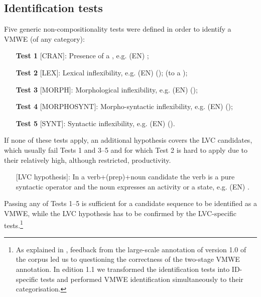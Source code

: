 \documentclass[output=paper,
modfonts,
]{langscibook}
\begin{document}
\subsection{Identification tests}
\label{sec:identify}
%
Five generic non-compositionality tests were defined in order to identify a VMWE (of any category):
\begin{itemize}
\item[]\label{test:cran}\textbf{Test 1} [CRAN]: Presence of a , e.g. (EN) ; 
\item[]\label{test:lex}\textbf{Test 2} [LEX]: Lexical inflexibility, e.g. (EN)  ();  (\ile to { a }); 
\item[]\label{test:morph}\textbf{Test 3} [MORPH]: Morphological inflexibility, e.g. (EN)  (); 
\item[]\label{test:morphosynt}\textbf{Test 4} [MORPHOSYNT]: Morpho-syntactic inflexibility, e.g. (EN)  (); 
\item[]\label{test:synt}\textbf{Test 5} [SYNT]: Syntactic inflexibility, e.g. (EN)  ().
\end{itemize}
If none of these tests apply, an additional hypothesis covers the %
LVC candidates, which usually fail Tests 1 %
and 3--5 
and for which Test 2 %
is hard to apply due to their relatively high, although restricted, productivity. 

\begin{itemize}
\item[][LVC hypothesis]: In a verb+(prep)+noun candidate the verb is a pure syntactic operator and the noun expresses an activity or a state, e.g. (EN) .
\end{itemize}
Passing any of Tests 1--5 is sufficient for a candidate sequence to be identified as a VMWE, while the LVC hypothesis has to be confirmed by the LVC-specific tests.\footnote{As explained in , feedback from the large-scale annotation of version 1.0 of the corpus led us to questioning the correctness of the two-stage VMWE annotation. In edition 1.1 we transformed the identification tests into ID-specific tests and performed VMWE identification simultaneously to their categorisation.}
\end{document}
